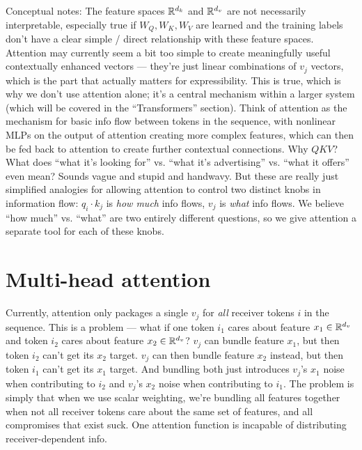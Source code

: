 \documentclass[12pt]{article}
\begin{document}
\begin{outline}
Conceptual notes:
\1 The feature spaces $\mathbb{R}^{d_k}$ and $\mathbb{R}^{d_v}$ are not necessarily interpretable, especially true if $W_Q,W_K,W_V$ are learned and the training labels don't have a clear simple / direct relationship with these feature spaces.
\1 Attention may currently seem a bit too simple to create meaningfully useful contextually enhanced vectors --- they're just linear combinations of $v_j$ vectors, which is the part that actually matters for expressibility. This is true, which is why we don't use attention alone; it's a central mechanism within a larger system (which will be covered in the ``Transformers'' section). Think of attention as the mechanism for basic info flow between tokens in the sequence, with nonlinear MLPs on the output of attention creating more complex features, which can then be fed back to attention to create further contextual connections.
\1 Why $QKV$? What does ``what it's looking for'' vs. ``what it's advertising'' vs. ``what it offers'' even mean? Sounds vague and stupid and handwavy. But these are really just simplified analogies for allowing attention to control two distinct knobs in information flow: $q_i \cdot k_j$ is \textit{how much} info flows, $v_j$ is \textit{what} info flows. We believe ``how much'' vs. ``what'' are two entirely different questions, so we give attention a separate tool for each of these knobs.
\0

\section{Multi-head attention}

Currently, attention only packages a single $v_j$ for \textit{all} receiver tokens $i$ in the sequence. This is a problem --- what if one token $i_1$ cares about feature $x_1 \in \mathbb{R}^{d_v}$ and token $i_2$ cares about feature $x_2 \in \mathbb{R}^{d_v}$? $v_j$ can bundle feature $x_1$, but then token $i_2$ can't get its $x_2$ target. $v_j$ can then bundle feature $x_2$ instead, but then token $i_1$ can't get its $x_1$ target. And bundling both just introduces $v_j$'s $x_1$ noise when contributing to $i_2$ and $v_j$'s $x_2$ noise when contributing to $i_1$. The problem is simply that when we use scalar weighting, we're bundling all features together when not all receiver tokens care about the same set of features, and all compromises that exist suck. One attention function is incapable of distributing receiver-dependent info. \\


\end{outline}
\end{document}
